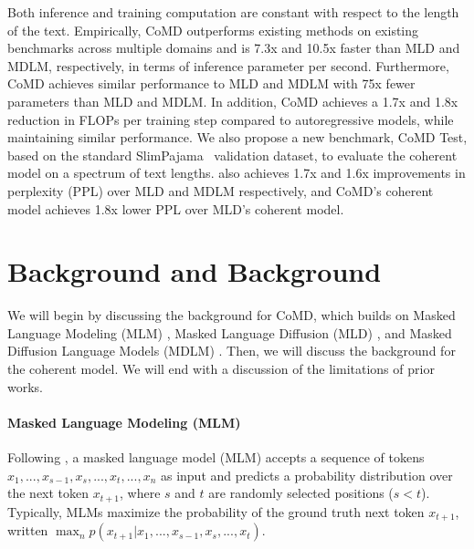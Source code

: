 Both inference and training computation are constant with respect to the length of the text. Empirically, CoMD outperforms existing methods on existing benchmarks across multiple domains and is 7.3x and 10.5x faster than MLD and MDLM, respectively, in terms of inference parameter per second. Furthermore, CoMD achieves similar performance to MLD and MDLM with 75x fewer parameters than MLD and MDLM. In addition, CoMD achieves a 1.7x and 1.8x reduction in FLOPs per training step compared to autoregressive models, while maintaining similar performance. We also propose a new benchmark, CoMD Test, based on the standard SlimPajama~\citep{soboleva2023slimpajama} validation dataset, to evaluate the coherent model on a spectrum of text lengths. \ours also achieves 1.7x and 1.6x improvements in perplexity (PPL) over MLD and MDLM respectively, and CoMD's coherent model achieves 1.8x lower PPL over MLD's coherent model. 



\section{Background and Background}

We will begin by discussing the background for CoMD, which builds on Masked Language Modeling (MLM) \citep{devlin-etal-2019-bert}, Masked Language Diffusion (MLD) \citep{austin2023structured}, and Masked Diffusion Language Models (MDLM) \citep{austin2023structured, shih2022training, austin2023structured, liu2024copula}. Then, we will discuss the background for the coherent model. We will end with a discussion of the limitations of prior works.

\paragraph{Masked Language Modeling (MLM)} Following \citet{devlin-etal-2019-bert}, a masked language model (MLM) accepts a sequence of tokens $x_1, ..., x_{s-1}, x_s, ..., x_t, ..., x_n$ as input and predicts a probability distribution over the next token $x_{t+1}$, where $s$ and $t$ are randomly selected positions ($s < t$). Typically, MLMs maximize the probability of the ground truth next token $x_{t+1}$, written $\max_n p(x_{t+1} | x_1, ..., x_{s-1}, x_s, ..., x_t)$.

